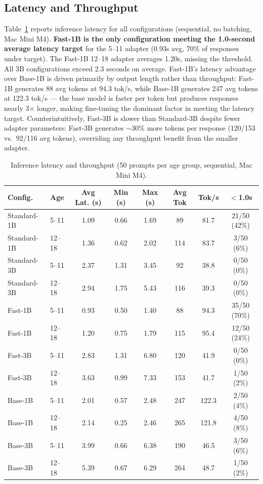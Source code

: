 \documentclass[journal]{IEEEtai}
\begin{document}
\subsection{Latency and Throughput}

Table~\ref{tab:res3} reports inference latency for all configurations (sequential, no batching, Mac Mini M4). \textbf{Fast-1B is the only configuration meeting the 1.0-second average latency target} for the 5--11 adapter (0.93s avg, 70\% of responses under target). The Fast-1B 12--18 adapter averages 1.20s, missing the threshold. All 3B configurations exceed 2.3 seconds on average. Fast-1B's latency advantage over Base-1B is driven primarily by output length rather than throughput: Fast-1B generates 88 avg tokens at 94.3 tok/s, while Base-1B generates 247 avg tokens at 122.3 tok/s --- the base model is faster per token but produces responses nearly 3$\times$ longer, making fine-tuning the dominant factor in meeting the latency target. Counterintuitively, Fast-3B is slower than Standard-3B despite fewer adapter parameters: Fast-3B generates $\sim$30\% more tokens per response (120/153 vs.\ 92/116 avg tokens), overriding any throughput benefit from the smaller adapter.

\begin{table}[!t]
  \caption{Inference latency and throughput (50 prompts per age group, sequential, Mac Mini M4).}
  \label{tab:res3}
  \small
  \begin{tabular}{llcccccc}
    \hline
    Config. & Age & Avg Lat. (s) & Min (s) & Max (s) & Avg Tok & Tok/s & $<$1.0s \\
    \hline
    Standard-1B & 5--11  & 1.09 & 0.66 & 1.69 & 89  & 81.7  & 21/50 (42\%) \\
    Standard-1B & 12--18 & 1.36 & 0.62 & 2.02 & 114 & 83.7  & 3/50 (6\%)   \\
    Standard-3B & 5--11  & 2.37 & 1.31 & 3.45 & 92  & 38.8  & 0/50 (0\%)   \\
    Standard-3B & 12--18 & 2.94 & 1.75 & 5.43 & 116 & 39.3  & 0/50 (0\%)   \\
    Fast-1B     & 5--11  & 0.93 & 0.50 & 1.40 & 88  & 94.3  & 35/50 (70\%) \\
    Fast-1B     & 12--18 & 1.20 & 0.75 & 1.79 & 115 & 95.4  & 12/50 (24\%) \\
    Fast-3B     & 5--11  & 2.83 & 1.31 & 6.80 & 120 & 41.9  & 0/50 (0\%)   \\
    Fast-3B     & 12--18 & 3.63 & 0.99 & 7.33 & 153 & 41.7  & 1/50 (2\%)   \\
    Base-1B     & 5--11  & 2.01 & 0.57 & 2.48 & 247 & 122.3 & 2/50 (4\%)   \\
    Base-1B     & 12--18 & 2.14 & 0.25 & 2.46 & 265 & 121.8 & 4/50 (8\%)   \\
    Base-3B     & 5--11  & 3.99 & 0.66 & 6.38 & 190 & 46.5  & 3/50 (6\%)   \\
    Base-3B     & 12--18 & 5.39 & 0.67 & 6.29 & 264 & 48.7  & 1/50 (2\%)   \\
    \hline
  \end{tabular}
\end{table}
\end{document}
